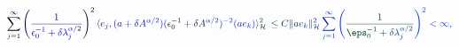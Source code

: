 \documentclass[12pt]{article}
\begin{document}
\makeatletter
\renewcommand*{\@textcolor}[3]{%
  \protect\leavevmode
  \begingroup
    \color#1{#2}#3%
  \endgroup
}
\makeatother
\begin{displaymath}
\mathcolor[RGB]{0,0,15}{\sum} _ { \mathcolor[RGB]{0,0,30}{j} \mathcolor[RGB]{0,0,45}{=} \mathcolor[RGB]{0,0,60}{1} } ^ { \mathcolor[RGB]{0,0,75}{\infty} } \mathcolor[RGB]{0,0,90}{\left(} \mathcolor[RGB]{0,0,105}{\frac { \mathcolor[RGB]{0,0,120}{1} } { \mathcolor[RGB]{0,0,135}{\epsilon} _ { \mathcolor[RGB]{0,0,150}{0} } ^ { \mathcolor[RGB]{0,0,165}{-} \mathcolor[RGB]{0,0,180}{1} } \mathcolor[RGB]{0,0,195}{+} \mathcolor[RGB]{0,0,210}{\delta} \mathcolor[RGB]{0,0,225}{\lambda} _ { \mathcolor[RGB]{0,0,240}{j} } ^ { \mathcolor[RGB]{0,0,255}{\alpha} \mathcolor[RGB]{0,15,0}{/} \mathcolor[RGB]{0,15,15}{2} } } } \mathcolor[RGB]{0,15,30}{\right)} ^ { \mathcolor[RGB]{0,15,45}{2} } \mathcolor[RGB]{0,15,60}{\langle} \mathcolor[RGB]{0,15,75}{e} _ { \mathcolor[RGB]{0,15,90}{j} } \mathcolor[RGB]{0,15,105}{,} \mathcolor[RGB]{0,15,120}{(} \mathcolor[RGB]{0,15,135}{a} \mathcolor[RGB]{0,15,150}{+} \mathcolor[RGB]{0,15,165}{\delta} \mathcolor[RGB]{0,15,180}{A} ^ { \mathcolor[RGB]{0,15,195}{\alpha} \mathcolor[RGB]{0,15,210}{/} \mathcolor[RGB]{0,15,225}{2} } \mathcolor[RGB]{0,15,240}{)} \mathcolor[RGB]{0,15,255}{(} \mathcolor[RGB]{0,30,0}{\epsilon} _ { \mathcolor[RGB]{0,30,15}{0} } ^ { \mathcolor[RGB]{0,30,30}{-} \mathcolor[RGB]{0,30,45}{1} } \mathcolor[RGB]{0,30,60}{+} \mathcolor[RGB]{0,30,75}{\delta} \mathcolor[RGB]{0,30,90}{A} ^ { \mathcolor[RGB]{0,30,105}{\alpha} \mathcolor[RGB]{0,30,120}{/} \mathcolor[RGB]{0,30,135}{2} } \mathcolor[RGB]{0,30,150}{)} ^ { \mathcolor[RGB]{0,30,165}{-} \mathcolor[RGB]{0,30,180}{2} } \mathcolor[RGB]{0,30,195}{(} \mathcolor[RGB]{0,30,210}{a} \mathcolor[RGB]{0,30,225}{e} _ { \mathcolor[RGB]{0,30,240}{k} } \mathcolor[RGB]{0,30,255}{)} \mathcolor[RGB]{0,45,0}{\rangle} _ { \mathcal { \mathcolor[RGB]{0,45,15}{H} } } ^ { \mathcolor[RGB]{0,45,30}{2} } \mathcolor[RGB]{0,45,45}{\,
\leq} \mathcolor[RGB]{0,45,60}{C} \mathcolor[RGB]{0,45,75}{\|} \mathcolor[RGB]{0,45,90}{a} \mathcolor[RGB]{0,45,105}{e} _ { \mathcolor[RGB]{0,45,120}{k} } \mathcolor[RGB]{0,45,135}{\|} _ { \mathcal { \mathcolor[RGB]{0,45,150}{H} } } ^ { \mathcolor[RGB]{0,45,165}{2} } \mathcolor[RGB]{0,45,180}{\sum} _ { \mathcolor[RGB]{0,45,195}{j} \mathcolor[RGB]{0,45,210}{=} \mathcolor[RGB]{0,45,225}{1} } ^ { \mathcolor[RGB]{0,45,240}{\infty} } \mathcolor[RGB]{0,45,255}{\left(} \mathcolor[RGB]{0,60,0}{\frac { \mathcolor[RGB]{0,60,15}{1} } { \mathcolor[RGB]{0,60,30}{\eps} _ { \mathcolor[RGB]{0,60,45}{0} } ^ { \mathcolor[RGB]{0,60,60}{-} \mathcolor[RGB]{0,60,75}{1} } \mathcolor[RGB]{0,60,90}{+} \mathcolor[RGB]{0,60,105}{\delta} \mathcolor[RGB]{0,60,120}{\lambda} _ { \mathcolor[RGB]{0,60,135}{j} } ^ { \mathcolor[RGB]{0,60,150}{\alpha} \mathcolor[RGB]{0,60,165}{/} \mathcolor[RGB]{0,60,180}{2} } } } \mathcolor[RGB]{0,60,195}{\right)} ^ { \mathcolor[RGB]{0,60,210}{2} } \mathcolor[RGB]{0,60,225}{<} \mathcolor[RGB]{0,60,240}{\infty} \mathcolor[RGB]{0,60,255}{,}
\end{displaymath}
\end{document}
